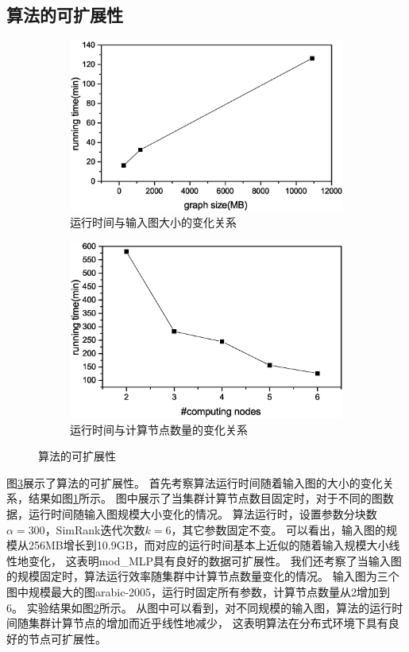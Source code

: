 \documentclass[master]{njuthesis}
\begin{document}
\subsection{算法的可扩展性}
\begin{figure}[h]
\centering
\begin{subfigure}[b]{0.48\textwidth}
	\center
	\includegraphics[width=1\textwidth]{figure/ch3_data_scalabity.eps}
	\caption{运行时间与输入图大小的变化关系}
	\label{fig:ch3:data_scalabity}
\end{subfigure}
\begin{subfigure}[b]{0.48\textwidth}
	\centering
	\includegraphics[width=1\textwidth]{figure/ch3_node_scalability.eps}
	\caption{运行时间与计算节点数量的变化关系}
	\label{fig:ch3:node_scalabity}
\end{subfigure}
\caption{算法的可扩展性}
\label{fig:ch3:scala}
\end{figure}
图\ref{fig:ch3:scala}展示了算法的可扩展性。
首先考察算法运行时间随着输入图的大小的变化关系，结果如图\ref{fig:ch3:data_scalabity}所示。
图中展示了当集群计算节点数目固定时，对于不同的图数据，运行时间随输入图规模大小变化的情况。 
算法运行时，设置参数分块数$\alpha=300$，SimRank迭代次数$k=6$，其它参数固定不变。
可以看出，输入图的规模从256MB增长到10.9GB，而对应的运行时间基本上近似的随着输入规模大小线性地变化，
这表明mod\string_MLP具有良好的数据可扩展性。
我们还考察了当输入图的规模固定时，算法运行效率随集群中计算节点数量变化的情况。
输入图为三个图中规模最大的图arabic-2005，运行时固定所有参数，计算节点数量从2增加到6。
实验结果如图\ref{fig:ch3:node_scalabity}所示。
从图中可以看到，对不同规模的输入图，算法的运行时间随集群计算节点的增加而近乎线性地减少，
这表明算法在分布式环境下具有良好的节点可扩展性。
\end{document}
